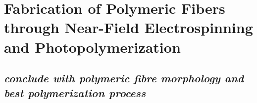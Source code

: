 
\chapter{Fabrication of Polymeric Fibers through Near-Field Electrospinning and Photopolymerization} %

\label{Chapter:5}

\section{}



\section{\emph{conclude with polymeric fibre morphology and best polymerization process}}
